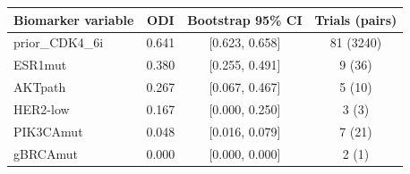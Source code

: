 \begin{tabular}{lccc}\toprule
Biomarker variable & ODI & Bootstrap 95\% CI & Trials (pairs) \\ \midrule
prior\_CDK4\_6i & 0.641 & [0.623, 0.658] & 81 (3240) \\
ESR1mut & 0.380 & [0.255, 0.491] & 9 (36) \\
AKTpath & 0.267 & [0.067, 0.467] & 5 (10) \\
HER2-low & 0.167 & [0.000, 0.250] & 3 (3) \\
PIK3CAmut & 0.048 & [0.016, 0.079] & 7 (21) \\
gBRCAmut & 0.000 & [0.000, 0.000] & 2 (1) \\
\bottomrule\end{tabular}
